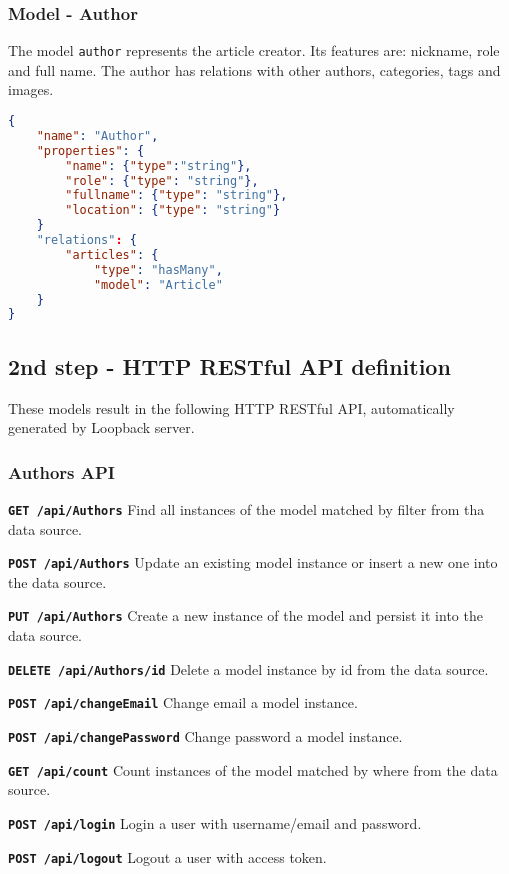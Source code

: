 \subsubsection{Model - Author}

The model \texttt{author} represents the article creator. Its features are: nickname, role and full name. The author has relations with other authors, categories, tags and images.

\begin{lstlisting}[language=json]
{
	"name": "Author",
	"properties": {
		"name": {"type":"string"},
    	"role": {"type": "string"},
    	"fullname": {"type": "string"},
    	"location": {"type": "string"}
	}
	"relations": {
    	"articles": {
     		"type": "hasMany",
      		"model": "Article"
    }
}
\end{lstlisting}

\subsection{2nd step - HTTP RESTful API definition}

These models result in the following HTTP RESTful API, automatically generated by Loopback server.

\subsubsection{Authors API}

\texttt{\textbf{GET /api/Authors}} Find all instances of the model matched by filter from tha data source.

\texttt{\textbf{POST /api/Authors}} Update an existing model instance or insert a new one into the data source.

\texttt{\textbf{PUT /api/Authors}} Create a new instance of the model and persist it into the data source.

\texttt{\textbf{DELETE /api/Authors/{id}}} Delete a model instance by id from the data source.

\texttt{\textbf{POST /api/changeEmail}} Change email a model instance.

\texttt{\textbf{POST /api/changePassword}} Change password a model instance.

\texttt{\textbf{GET /api/count}} Count instances of the model matched by where from the data source.

\texttt{\textbf{POST /api/login}} Login a user with username/email and password.

\texttt{\textbf{POST /api/logout}} Logout a user with access token.

